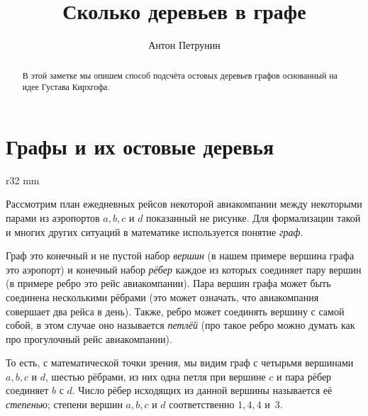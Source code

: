 \documentclass{article}
\begin{document}
\title{Сколько деревьев в графе}
\author{Антон Петрунин}
\date{}
\maketitle

\begin{abstract}
В этой заметке мы опишем способ подсчёта остовых деревьев графов
основанный на идее Густава Кирхгофа.
\end{abstract}


\section{Графы и их остовые деревья}

\begin{wrapfigure}{r}{32 mm}
\end{wrapfigure}

Рассмотрим план ежедневных рейсов некоторой авиакомпании между некоторыми парами из аэропортов $a,b,c$ и $d$
показанный не рисунке.
Для формализации такой и многих других ситуаций в математике используется понятие \emph{граф}.

Граф это конечный и не пустой набор \emph{вершин} (в нашем примере вершина графа это аэропорт) 
и конечный набор \emph{рёбер} каждое из которых соединяет пару вершин (в примере ребро это рейс авиакомпании).
Пара вершин графа может быть соединена несколькими рёбрами (это может означать, что авиакомпания совершает два рейса в день). 
Также, ребро может соединять вершину с самой собой, в этом случае оно называется \emph{петлёй} (про такое ребро можно думать как про прогулочный рейс авиакомпании).

То есть, с математической точки зрения, мы видим граф с четырьмя вершинами $a,b,c$ и $d$, 
шестью рёбрами, из них
одна петля при вершине $c$ и пара рёбер соединяет $b$ с $d$.
Число рёбер исходящих из данной вершины называется её \emph{степенью};
степени вершин $a,b,c$ и $d$ соответственно $1,4,4$ и~$3$.
\end{document}
